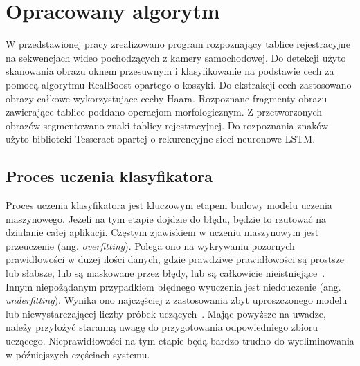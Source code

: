 
\chapter{Opracowany algorytm}
\label{ch:opracowany-algorytm}
W przedstawionej pracy zrealizowano program rozpoznający tablice rejestracyjne na sekwencjach wideo pochodzących z kamery samochodowej.
Do detekcji użyto skanowania obrazu oknem przesuwnym i klasyfikowanie na podstawie cech za pomocą algorytmu RealBoost opartego o koszyki.
Do ekstrakcji cech zastosowano obrazy całkowe wykorzystujące cechy Haara.
Rozpoznane fragmenty obrazu zawierające tablice poddano operacjom morfologicznym.
Z przetworzonych obrazów segmentowano znaki tablicy rejestracyjnej.
Do rozpoznania znaków użyto biblioteki Tesseract opartej o rekurencyjne sieci neuronowe LSTM\@.


\section{Proces uczenia klasyfikatora}
\label{sec:proces-uczenia-klasyfikatora}
Proces uczenia klasyfikatora jest kluczowym etapem budowy modelu uczenia maszynowego.
Jeżeli na tym etapie dojdzie do błędu, będzie to rzutować na działanie całej aplikacji.
Częstym zjawiskiem w uczeniu maszynowym jest przeuczenie (ang. \textit{overfitting}).
Polega ono na wykrywaniu pozornych prawidłowości w dużej ilości danych, gdzie prawdziwe prawidłowości są prostsze lub słabsze, lub są maskowane przez błędy, lub są całkowicie nieistniejące~\cite{overfitting}.
Innym niepożądanym przypadkiem błędnego wyuczenia jest niedouczenie (ang. \textit{underfitting}).
Wynika ono najczęściej z zastosowania zbyt uproszczonego modelu lub niewystarczającej liczby próbek uczących~\cite{overfitting}.
Mając powyższe na uwadze, należy przyłożyć staranną uwagę do przygotowania odpowiedniego zbioru uczącego.
Nieprawidłowości na tym etapie będą bardzo trudno do wyeliminowania w późniejszych częściach systemu.

